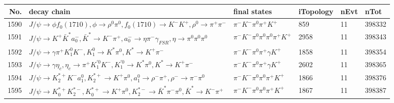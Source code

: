 \begin{table}[htbp] 
\begin{center}
\begin{small}
\begin{tabular}{rlllll}\hline\hline
 No. & decay chain & final states &  iTopology & nEvt & nTot \\\hline
1590&$J/\psi       \rightarrow \phi           f_{0}(1710)    , \phi            \rightarrow \rho^{0}      \pi^{0}        , f_{0}(1710)     \rightarrow K^{-}          K^{+}          , \rho^{0}       \rightarrow \pi^{+}        \pi^{-}        $&$\pi^{-}        K^{-}          \pi^{0}        \pi^{+}        K^{+}          $&  859&   11&398332\\
1591&$J/\psi       \rightarrow K^{+}          \bar{K}^{*}   a_{0}^{-}      , \bar{K}^{*}    \rightarrow K^{-}          \pi^{+}        , a_{0}^{-}       \rightarrow \eta          \pi^{-}        \gamma_{FSR} , \eta           \rightarrow \pi^{0}        \pi^{0}        \pi^{0}        $&$\pi^{-}        K^{-}          \pi^{0}        \pi^{0}        \pi^{0}        \pi^{+}        K^{+}          $& 2958&   11&398343\\
1592&$J/\psi       \rightarrow \gamma       \pi^{+}        K_1^{0}        K^{-}          , K_1^{0}         \rightarrow K^{*}          \pi^{0}        , K^{*}           \rightarrow K^{+}          \pi^{-}        $&$\pi^{-}        K^{-}          \pi^{0}        \pi^{+}        \gamma       K^{+}          $& 1858&   11&398354\\
1593&$J/\psi       \rightarrow \gamma       \eta_{c}    , \eta_{c}     \rightarrow \pi^{+}        K_1^{'0}      K^{-}          , K_1^{'0}       \rightarrow K^{*}          \pi^{0}        , K^{*}           \rightarrow K^{+}          \pi^{-}        $&$\pi^{-}        K^{-}          \pi^{0}        \pi^{+}        \gamma       K^{+}          $& 2602&   11&398365\\
1594&$J/\psi       \rightarrow K_2^{*+}       K^{-}          a_{1}^{0}      , K_2^{*+}        \rightarrow K^{+}          \pi^{0}        , a_{1}^{0}       \rightarrow \rho^{-}      \pi^{+}        , \rho^{-}       \rightarrow \pi^{-}        \pi^{0}        $&$\pi^{-}        K^{-}          \pi^{0}        \pi^{0}        \pi^{+}        K^{+}          $& 1866&   11&398376\\
1595&$J/\psi       \rightarrow K_{0}^{*+}     K_2^{*-}       , K_{0}^{*+}      \rightarrow K^{+}          \pi^{0}        , K_2^{*-}        \rightarrow \bar{K}^{*}   \pi^{-}        \pi^{0}        , \bar{K}^{*}    \rightarrow K^{-}          \pi^{+}        $&$\pi^{-}        K^{-}          \pi^{0}        \pi^{0}        \pi^{+}        K^{+}          $& 1867&   11&398387\\

\end{tabular}
\end{small}
\end{center}
\end{table}
